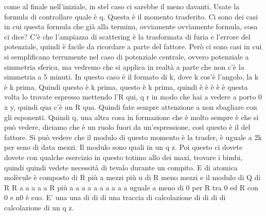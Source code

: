 {\begin{soluzione}
come al finale nell'iniziale, in stel caso ci sarebbe il meno davanti. Usate la formula di controllare quale è q. Questa è il momento trasferito. Ci sono dei casi in cui questa formula che già alla termina, ovviamente ovviamente formula, cosa ci dice? C'è che l'ampiazza di scattering è la trasformata di furia e l'errore del potenziale, quindi è facile da ricordare a parte del fattore. Però ci sono casi in cui si semplificano terrumente nel caso di potenziale centrale, ovvero potenziale a simmetria sferica, ma vedremo che si applica in realtà a parte che non c'è la simmetria a 5 minuti. In questo caso è il formato di k, dove k cos'è l'angolo, la k è k prima. Quindi questo è k prima, questo è k prima, quindi è è è è è questa volta lo trovate espresso mettendo l'R qui, q r in modo che hai a vedere a porto 0 x y, quindi qua c'è un R qua. Quindi fate sempre attenzione a non sbagliare con gli esponenti. Quindi q, una altra cosa in formazione che è molto sempre è che si può vedere, diciamo che è un ruolo fuori da un'espressione, così questo è il del fattore. Si può vedere che il modulo di questo momento è la trasfer, è uguale a 2k per seno di data mezzi. Il modulo sono quali in un q z. Poi questo ci dovete dovete con qualche esercizio in questo totimo allo dei maxi, trovare i bimbi, quindi quindi vedete necessità di tevalo durante un compito. E di atomica molècule è composto di R più a mezzi più u di R meno mezzi e il modulo di Q di R R a a a a a R più a a a a a a a a a a uguale a meno di 0 per R tra 0 ed R con 0 e n0 è suo. E' una una di di di una traccia di calcolazione di di di di calcolazione di un q z.


\end{soluzione}}
